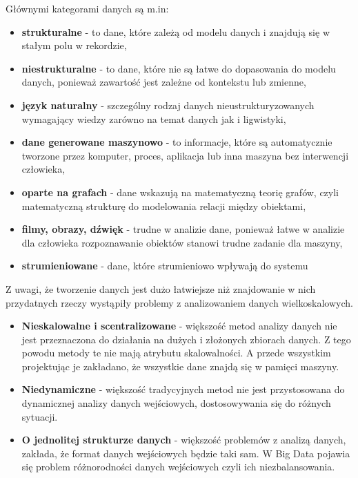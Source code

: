 \documentclass{article}
\begin{document}
Głównymi kategorami danych są m.in: 
\begin{itemize}
    \item \textbf{strukturalne} - to dane, które zależą od modelu danych i znajdują się w stałym polu w rekordzie,
    \item \textbf{niestrukturalne} - to dane, które nie są łatwe do dopasowania do modelu danych, ponieważ zawartość jest zależne od kontekstu lub zmienne,
    \item \textbf{język naturalny} -  szczególny rodzaj danych nieustrukturyzowanych wymagający wiedzy zarówno na temat danych jak i ligwistyki,
    \item \textbf{dane generowane maszynowo} - to informacje, które są automatycznie tworzone przez komputer, proces, aplikacja lub inna maszyna bez interwencji człowieka,
    \item \textbf{oparte na grafach} - dane wskazują na matematyczną teorię grafów, czyli matematyczną strukturę do modelowania relacji między obiektami,
    \item \textbf{filmy, obrazy, dźwięk} - trudne w analizie dane, ponieważ łatwe w analizie dla człowieka rozpoznawanie obiektów stanowi trudne zadanie dla maszyny,
    \item \textbf{strumieniowane} - dane, które strumieniowo wpływają do systemu
\end{itemize}
Z uwagi, że tworzenie danych jest dużo łatwiejsze niż znajdowanie w nich przydatnych rzeczy wystąpiły problemy z analizowaniem danych wielkoskalowych. \begin{itemize}
    \item \textbf{Nieskalowalne i scentralizowane} - większość metod analizy danych nie jest przeznaczona do działania na dużych i złożonych zbiorach danych. Z tego powodu metody te nie mają atrybutu skalowalności. A przede wszystkim projektując je zakładano, że wszystkie dane znajdą się w pamięci maszyny.
    \item \textbf{Niedynamiczne} - większość tradycyjnych metod nie jest przystosowana do dynamicznej analizy danych wejściowych, dostosowywania się do różnych sytuacji.
    \item \textbf{O jednolitej strukturze danych} - większość problemów z analizą danych, zakłada, że format danych wejściowych będzie taki sam. W Big Data pojawia się problem różnorodności danych wejściowych czyli ich niezbalansowania.
\end{itemize}
\end{document}
